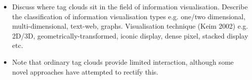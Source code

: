 
\begin{itemize}
	\item Discuss where tag clouds sit in the field of information visualisation. Describe the classification of information visualisation types e.g. one/two dimensional, multi-dimensional, text-web, graphs. Visualisation technique (Keim 2002) e.g. 2D/3D, geometrically-transformed, iconic display, dense pixel, stacked display etc. 

	\item Note that ordinary tag clouds provide limited interaction, although some novel approaches have attempted to rectify this.
\end{itemize}



